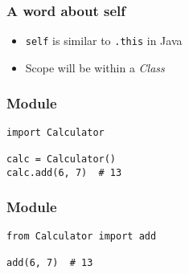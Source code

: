 \documentclass[bigger, presentation]{beamer}
\begin{document}
\begin{frame}
\frametitle{A word about \textbf{self}}
\label{sec-3-5}


\begin{itemize}
\item \texttt{self} is similar to \texttt{.this} in Java
\item Scope will be within a \emph{Class}
\end{itemize}
\end{frame}
\begin{frame}[fragile]
\frametitle{Module}
\label{sec-3-6}



\begin{verbatim}
import Calculator

calc = Calculator()
calc.add(6, 7)  # 13
\end{verbatim}
\end{frame}
\begin{frame}[fragile]
\frametitle{Module}
\label{sec-3-7}



\begin{verbatim}
from Calculator import add

add(6, 7)  # 13
\end{verbatim}
\end{frame}
\end{document}
